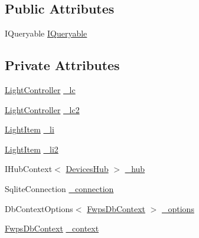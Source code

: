 \subsection*{Public Attributes}
\begin{DoxyCompactItemize}
\item 
I\+Queryable \mbox{\hyperlink{class_web_api_1_1_unit_1_1_test_1_1_u_t___light_controller_ab9b42691bab59f14c340e39701aa29f1}{I\+Queryable}}
\end{DoxyCompactItemize}
\subsection*{Private Attributes}
\begin{DoxyCompactItemize}
\item 
\mbox{\hyperlink{class_f_w_p_s_1_1_controllers_1_1_light_controller}{Light\+Controller}} \mbox{\hyperlink{class_web_api_1_1_unit_1_1_test_1_1_u_t___light_controller_a5b9e5a750768c95c01196098a089e112}{\+\_\+lc}}
\item 
\mbox{\hyperlink{class_f_w_p_s_1_1_controllers_1_1_light_controller}{Light\+Controller}} \mbox{\hyperlink{class_web_api_1_1_unit_1_1_test_1_1_u_t___light_controller_a19e79b885dbb299e276e26385369a29a}{\+\_\+lc2}}
\item 
\mbox{\hyperlink{class_f_w_p_s_1_1_models_1_1_light_item}{Light\+Item}} \mbox{\hyperlink{class_web_api_1_1_unit_1_1_test_1_1_u_t___light_controller_ad4e3d1bb24258a321b62a22e28ba2850}{\+\_\+li}}
\item 
\mbox{\hyperlink{class_f_w_p_s_1_1_models_1_1_light_item}{Light\+Item}} \mbox{\hyperlink{class_web_api_1_1_unit_1_1_test_1_1_u_t___light_controller_a22d96236b6f43aaa4eaf145069cf14fb}{\+\_\+li2}}
\item 
I\+Hub\+Context$<$ \mbox{\hyperlink{class_f_w_p_s_1_1_devices_hub}{Devices\+Hub}} $>$ \mbox{\hyperlink{class_web_api_1_1_unit_1_1_test_1_1_u_t___light_controller_abd152b75aa8eae679e9147eaf37013a8}{\+\_\+hub}}
\item 
Sqlite\+Connection \mbox{\hyperlink{class_web_api_1_1_unit_1_1_test_1_1_u_t___light_controller_a77d9c49459869bb7874f9e4ee3285139}{\+\_\+connection}}
\item 
Db\+Context\+Options$<$ \mbox{\hyperlink{class_f_w_p_s_1_1_data_1_1_fwps_db_context}{Fwps\+Db\+Context}} $>$ \mbox{\hyperlink{class_web_api_1_1_unit_1_1_test_1_1_u_t___light_controller_a0633e7946306da8f3a2e6b9c6a98baf0}{\+\_\+options}}
\item 
\mbox{\hyperlink{class_f_w_p_s_1_1_data_1_1_fwps_db_context}{Fwps\+Db\+Context}} \mbox{\hyperlink{class_web_api_1_1_unit_1_1_test_1_1_u_t___light_controller_aa4114d660f5fe9c80e43e1114f675b45}{\+\_\+context}}
\end{DoxyCompactItemize}



